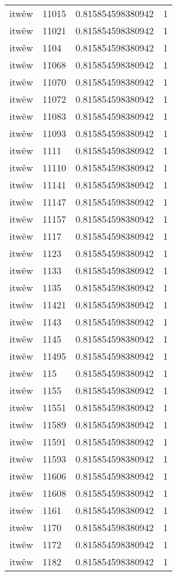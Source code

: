 \begin{longtable}{llll}
itwêw & 11015 & 0.815854598380942 & 1 \\
itwêw & 11021 & 0.815854598380942 & 1 \\
itwêw & 1104 & 0.815854598380942 & 1 \\
itwêw & 11068 & 0.815854598380942 & 1 \\
itwêw & 11070 & 0.815854598380942 & 1 \\
itwêw & 11072 & 0.815854598380942 & 1 \\
itwêw & 11083 & 0.815854598380942 & 1 \\
itwêw & 11093 & 0.815854598380942 & 1 \\
itwêw & 1111 & 0.815854598380942 & 1 \\
itwêw & 11110 & 0.815854598380942 & 1 \\
itwêw & 11141 & 0.815854598380942 & 1 \\
itwêw & 11147 & 0.815854598380942 & 1 \\
itwêw & 11157 & 0.815854598380942 & 1 \\
itwêw & 1117 & 0.815854598380942 & 1 \\
itwêw & 1123 & 0.815854598380942 & 1 \\
itwêw & 1133 & 0.815854598380942 & 1 \\
itwêw & 1135 & 0.815854598380942 & 1 \\
itwêw & 11421 & 0.815854598380942 & 1 \\
itwêw & 1143 & 0.815854598380942 & 1 \\
itwêw & 1145 & 0.815854598380942 & 1 \\
itwêw & 11495 & 0.815854598380942 & 1 \\
itwêw & 115 & 0.815854598380942 & 1 \\
itwêw & 1155 & 0.815854598380942 & 1 \\
itwêw & 11551 & 0.815854598380942 & 1 \\
itwêw & 11589 & 0.815854598380942 & 1 \\
itwêw & 11591 & 0.815854598380942 & 1 \\
itwêw & 11593 & 0.815854598380942 & 1 \\
itwêw & 11606 & 0.815854598380942 & 1 \\
itwêw & 11608 & 0.815854598380942 & 1 \\
itwêw & 1161 & 0.815854598380942 & 1 \\
itwêw & 1170 & 0.815854598380942 & 1 \\
itwêw & 1172 & 0.815854598380942 & 1 \\
itwêw & 1182 & 0.815854598380942 & 1 \\

\end{longtable}
